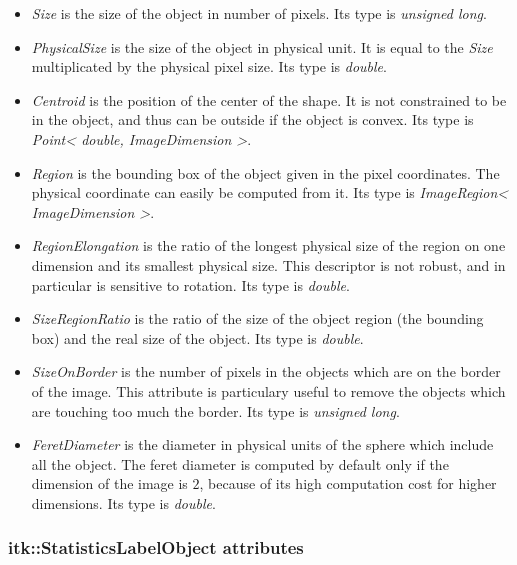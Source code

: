 \documentclass{InsightArticle}
\begin{document}
\begin{itemize}
  \item {\em Size} is the size of the object in number of pixels. Its type is
{\em unsigned long}.
  \item {\em PhysicalSize} is the size of the object in physical unit. It is equal
to the {\em Size} multiplicated by the physical pixel size. Its type is {\em double}.
  \item {\em Centroid} is the position of the center of the shape. It is not
constrained to be in the object, and thus can be outside if the object is convex.
Its type is {\em Point< double, ImageDimension >}. 
  \item {\em Region} is the bounding box of the object given in the pixel coordinates.
The physical coordinate can easily be computed from it. Its type is
{\em ImageRegion< ImageDimension >}.
  \item {\em RegionElongation} is the ratio of the longest physical size of the region
on one dimension and its smallest physical size. This descriptor is not robust, and in
particular is sensitive to rotation. Its type is {\em double}.
  \item {\em SizeRegionRatio} is the ratio of the size of the object region (the
bounding box) and the real size of the object. Its type is {\em double}.
  \item {\em SizeOnBorder} is the number of pixels in the objects which are on the border
of the image. This attribute is particulary useful to remove the objects which are touching
too much the border. Its type is {\em unsigned long}.
  \item {\em FeretDiameter} is the diameter in physical units of the sphere which include
all the object. The feret diameter is computed by default only if the dimension of the image
is $2$, because of its high computation cost for higher dimensions. Its type is {\em double}.
\end{itemize}


\subsubsection{itk::StatisticsLabelObject attributes}
\end{document}
